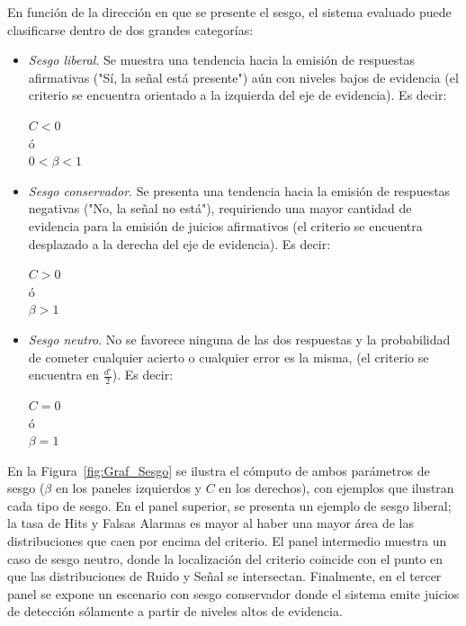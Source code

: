 \begin{itemize}
En función de la dirección en que se presente el sesgo, el sistema evaluado puede clasificarse dentro de dos grandes categorías:\\

\begin{itemize}
\item \textsl{Sesgo liberal}. Se muestra una tendencia hacia la emisión de respuestas afirmativas ("Sí, la señal está presente") aún con niveles bajos de evidencia (el criterio se encuentra orientado a la izquierda del eje de evidencia). Es decir: \\
\begin{center}
$C < 0$\\
ó\\
$0 < \beta < 1$\\
\end{center}

\item \textsl{Sesgo conservador}. Se presenta una tendencia hacia la emisión de respuestas negativas ("No, la señal no está"), requiriendo una mayor cantidad de evidencia para la emisión de juicios afirmativos (el criterio se encuentra desplazado a la derecha del eje de evidencia). Es decir: \\
\begin{center}
$C > 0$\\
ó\\
$\beta > 1$\\
\end{center}

\item \textsl{Sesgo neutro}. No se favorece ninguna de las dos respuestas y la probabilidad de cometer cualquier acierto o cualquier error es la misma, (el criterio se encuentra en $\frac{d'}{2}$). Es decir: \\
\begin{center}
$C = 0$\\
ó\\
$\beta = 1$\\
\end{center}
\end{itemize}

En la Figura~\ref{fig:Graf_Sesgo} se ilustra el cómputo de ambos parámetros de sesgo ($\beta$ en los paneles izquierdos y $C$ en los derechos), con ejemplos que ilustran cada tipo de sesgo. En el panel superior, se presenta un ejemplo de sesgo liberal; la tasa de Hits y Falsas Alarmas es mayor al haber una mayor área de las distribuciones que caen por encima del criterio. El panel intermedio muestra un caso de sesgo neutro, donde la localización del criterio coincide con el punto en que las distribuciones de Ruido y Señal se intersectan. Finalmente, en el tercer panel se expone un escenario con sesgo conservador donde el sistema emite juicios de detección sólamente a partir de niveles altos de evidencia.\\


\end{itemize}
